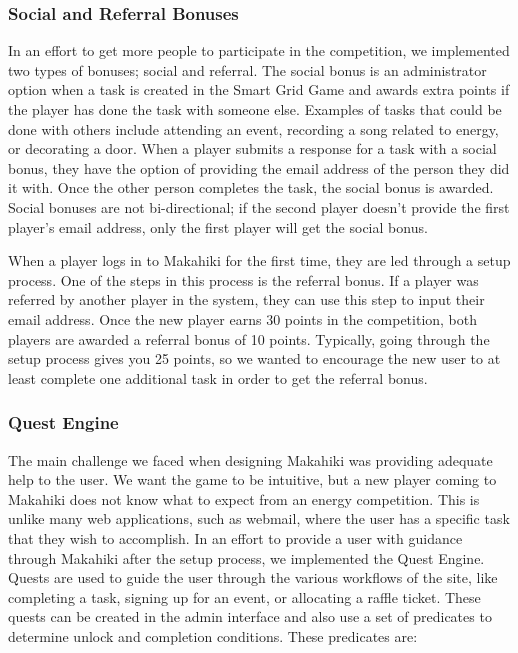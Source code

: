 \documentclass{acm_proc_article-sp}
\begin{document}
\subsubsection{Social and Referral Bonuses}

In an effort to get more people to participate in the competition, we implemented two types of bonuses; social and referral. The social bonus is an administrator option when a task is created in the Smart Grid Game and awards extra points if the player has done the task with someone else. Examples of tasks that could be done with others include attending an event, recording a song related to energy, or decorating a door. When a player submits a response for a task with a social bonus, they have the option of providing the email address of the person they did it with. Once the other person completes the task, the social bonus is awarded. Social bonuses are not bi-directional; if the second player doesn't provide the first player's email address, only the first player will get the social bonus.

When a player logs in to Makahiki for the first time, they are led through a setup process. One of the steps in this process is the referral bonus. If a player was referred by another player in the system, they can use this step to input their email address. Once the new player earns 30 points in the competition, both players are awarded a referral bonus of 10 points. Typically, going through the setup process gives you 25 points, so we wanted to encourage the new user to at least complete one additional task in order to get the referral bonus.

\subsubsection{Quest Engine}

The main challenge we faced when designing Makahiki was providing adequate help to the user. We want the game to be intuitive, but a new player coming to Makahiki does not know what to expect from an energy competition. This is unlike many web applications, such as webmail, where the user has a specific task that they wish to accomplish. In an effort to provide a user with guidance through Makahiki after the setup process, we implemented the Quest Engine. Quests are used to guide the user through the various workflows of the site, like completing a task, signing up for an event, or allocating a raffle ticket. These quests can be created in the admin interface and also use a set of predicates to determine unlock and completion conditions. These predicates are:
\end{document}
